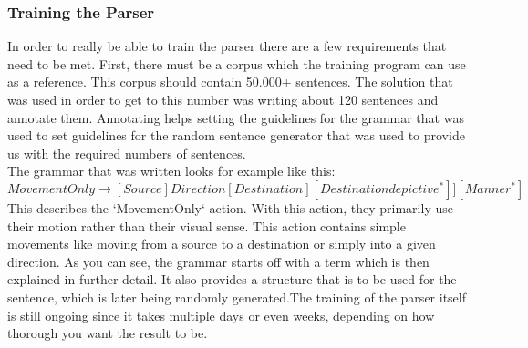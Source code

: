 \documentclass[main.tex]{subfiles}
\begin{document}
		\subsubsection{Training the Parser}
		In order to really be able to train the parser there are a few requirements that need to be met. First, there must be a corpus which the training program can use as a reference. This corpus should contain 50.000+ sentences. The solution that was used in order to get to this number was writing about 120 sentences and annotate them. Annotating helps setting the guidelines for the grammar that was used to set guidelines for the random sentence generator that was used to provide us with the required numbers of sentences.\\
		The grammar that was written looks for example like this:
		\begin{equation}
		MovementOnly \rightarrow [Source]Direction[Destination][Destinationdepictive^*]][Manner^*]
		\end{equation}		
		This describes the ‘MovementOnly‘ action. With this action, they primarily use their motion rather than their visual sense. This action contains simple movements like moving from a source to a destination or simply into a given direction.
		As you can see, the grammar starts off with a term which is then explained in further detail. It also provides a structure that is to be used for the sentence, which is later being randomly generated.The training of the parser itself is still ongoing since it takes multiple days or even weeks, depending on how thorough you want the result to be.
	
\end{document}
